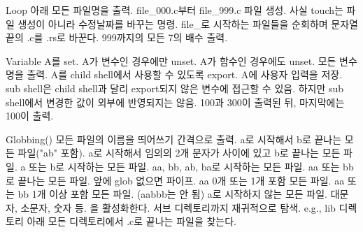   \itm Loop
  \bitmz
    \itm {} \rarr {} 아래 모든 파일명을 출력.
    \itm {}
    \itm {}
    \itm {}
    \itm {} \rarr file\_000.c부터 file\_999.c 파일 생성. 사실 touch는 파일 생성이 아니라 수정날짜를 바꾸는 명령.
    \itm {} \rarr file\_로 시작하는 파일들을 순회하며 문자열 끝의 .c를 .rs로 바꾼다.
    \itm {} \rarr 999까지의 모든 7의 배수 출력.
  \eitmz

  \itm Variable
  \bitmz
    \itm {} \rarr A를 set.
    \itm {} \rarr A가 변수인 경우에만 unset.
    \itm {} \rarr A가 함수인 경우에도 unset.
    \itm {} \rarr 모든 변수명을 출력.
    \itm {} \rarr A를 child shell에서 사용할 수 있도록 export.
    \itm {} \rarr A에 사용자 입력을 저장.
    \bitmz
      \itm sub shell은 child shell과 달리 export되지 않은 변수에 접근할 수 있음. 하지만 sub shell에서 변경한 값이 외부에 반영되지는 않음.  \rarr 100과 300이 출력된 뒤, 마지막에는 100이 출력.
    \eitmz
  \eitmz

  \itm Globbing(\code{*})
  \bitmz
    \itm {} \rarr 모든 파일의 이름을 띄어쓰기 간격으로 출력.
    \itm {} \rarr a로 시작해서 b로 끝나는 모든 파일("ab" 포함).
    \itm {} \rarr a로 시작해서 임의의 2개 문자가 사이에 있고 b로 끝나는 모든 파일.
    \itm {} \rarr a 또는 b로 시작하는 모든 파일.
    \itm {} \rarr aa, bb, ab, ba로 시작하는 모든 파일.
    \itm {} \rarr aa 또는 bb로 끝나는 모든 파일. 앞에 glob 없으면 파이프.
    \itm {} \rarr aa 0개 또는 1개 포함 모든 파일.
    \itm {} \rarr aa 또는 bb 1개 이상 포함 모든 파일. (aabbb는 안 됨)
    \itm {} \rarr a로 시작하지 않는 모든 파일.
    \itm \code{[[:upper:]], [[:lower:]], [[:digit:]], [[:space:]], [[:alpha:]], [[:alnum:]]} \rarr 대문자, 소문자, 숫자 등.
    \itm {} \rarr \code{**}을 활성화한다. 서브 디렉토리까지 재귀적으로 탐색. e.g.,  \rarr lib 디렉토리 아래 모든 디렉토리에서 .c로 끝나는 파일을 찾는다.
    \itm {} \rarr {}
  \eitmz

